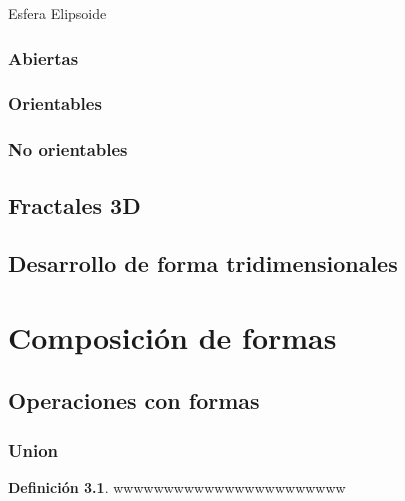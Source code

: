 \documentclass[
  16pt,
]{krantz}
\theoremstyle{definition}
\newtheorem{definition}{Definición}[chapter]
\theoremstyle{definition}
\theoremstyle{definition}
\theoremstyle{definition}
\theoremstyle{remark}
\begin{document}
Esfera Elipsoide

\hypertarget{abiertas}{%
\subsection{Abiertas}\label{abiertas}}

\hypertarget{orientables}{%
\subsection{Orientables}\label{orientables}}

\hypertarget{no-orientables}{%
\subsection{No orientables}\label{no-orientables}}

\hypertarget{fractales-3d}{%
\section{Fractales 3D}\label{fractales-3d}}

\hypertarget{desarrollo-de-forma-tridimensionales}{%
\section{Desarrollo de forma tridimensionales}\label{desarrollo-de-forma-tridimensionales}}

\hypertarget{composiciuxf3n-de-formas}{%
\chapter{Composición de formas}\label{composiciuxf3n-de-formas}}

\hypertarget{operaciones-con-formas}{%
\section{Operaciones con formas}\label{operaciones-con-formas}}

\hypertarget{union}{%
\subsection{Union}\label{union}}

\begin{definition}
\protect\hypertarget{def:unnamed-chunk-2}{}{\label{def:unnamed-chunk-2} }wwwwwwwwwwwwwwwwwwwwwww
\end{definition}
\end{document}
